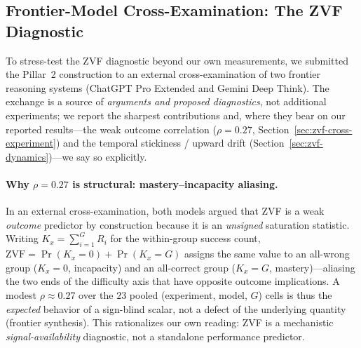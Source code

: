 %

\subsection{Frontier-Model Cross-Examination: The ZVF Diagnostic}
\label{sec:frontier-zvf}

To stress-test the ZVF diagnostic beyond our own measurements, we
submitted the Pillar~2 construction to an external cross-examination of
two frontier reasoning systems (ChatGPT Pro Extended and Gemini Deep
Think). The exchange is a source of \emph{arguments and proposed
diagnostics}, not additional experiments; we report the sharpest
contributions and, where they bear on our reported results---the weak
outcome correlation ($\rho = 0.27$, Section~\ref{sec:zvf-cross-experiment})
and the temporal stickiness / upward drift
(Section~\ref{sec:zvf-dynamics})---we say so explicitly.

\paragraph{Why $\rho = 0.27$ is structural: mastery--incapacity aliasing.}
In an external cross-examination, both models argued that ZVF is a weak
\emph{outcome} predictor by construction because it is an \emph{unsigned}
saturation statistic. Writing $K_x=\sum_{i=1}^{G} R_i$ for the within-group
success count, $\mathrm{ZVF}=\Pr(K_x=0)+\Pr(K_x=G)$ assigns the same value
to an all-wrong group ($K_x=0$, incapacity) and an all-correct group
($K_x=G$, mastery)---aliasing the two ends of the difficulty axis that
have opposite outcome implications. A modest $\rho\approx0.27$ over the
$23$ pooled (experiment, model, $G$) cells is thus the \emph{expected}
behavior of a sign-blind scalar, not a
defect of the underlying quantity (frontier synthesis). This rationalizes
our own reading: ZVF is a mechanistic \emph{signal-availability}
diagnostic, not a standalone performance predictor.

